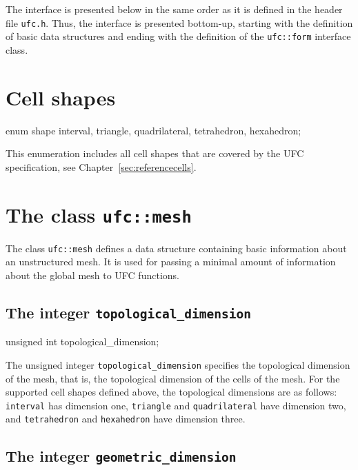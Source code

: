 The interface is presented below in the same order as it is
defined in the header file \texttt{ufc.h}. Thus, the interface is
presented bottom-up, starting with the definition of basic data
structures and ending with the definition of the \texttt{ufc::form}
interface class.

\section{Cell shapes}

\begin{code}
enum shape {interval,
            triangle,
            quadrilateral,
            tetrahedron,
            hexahedron};
\end{code}

This enumeration includes all cell shapes that are covered by the UFC
specification, see Chapter~\ref{sec:referencecells}.

\section{The class \texttt{ufc::mesh}}

The class \texttt{ufc::mesh} defines a data structure containing basic
information about an unstructured mesh. It is used for passing a
minimal amount of information about the global mesh to UFC functions.

\subsection{The integer \texttt{topological\_dimension}}

\begin{code}
unsigned int topological_dimension;
\end{code}

The unsigned integer \texttt{topological\_dimension} specifies the
topological dimension of the mesh, that is, the topological dimension
of the cells of the mesh. For the supported cell shapes defined above,
the topological dimensions are as follows: \texttt{interval} has
dimension one, \texttt{triangle} and \texttt{quadri\-lateral} have
dimension two, and \texttt{tetrahedron} and \texttt{hexahedron} have
dimension three.

\subsection{The integer \texttt{geometric\_dimension}}

